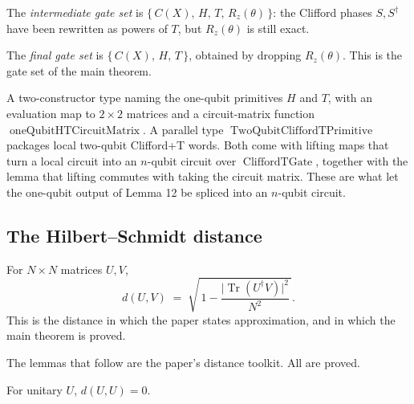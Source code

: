 \begin{definition}
  \label{def:gate_cliffordtrz}
  \leanok
  The \emph{intermediate gate set} is
  $\{\, C(X),\, H,\, T,\, R_z(\theta) \,\}$: the Clifford phases $S, S^\dagger$
  have been rewritten as powers of $T$, but $R_z(\theta)$ is still exact.
\end{definition}

\begin{definition}
  \label{def:gate_cliffordt}
  \leanok
  The \emph{final gate set} is $\{\, C(X),\, H,\, T \,\}$, obtained by
  dropping $R_z(\theta)$.  This is the gate set of the main theorem.
\end{definition}

\begin{definition}
  \label{def:ht_primitive}
  \leanok
  A two-constructor type naming the one-qubit primitives $H$ and $T$, with an
  evaluation map to $2 \times 2$ matrices and a circuit-matrix function
  $\operatorname{oneQubitHTCircuitMatrix}$.  A parallel type
  $\operatorname{TwoQubitCliffordTPrimitive}$ packages local two-qubit
  Clifford+T words.  Both come with lifting maps that turn a local circuit into
  an $n$-qubit circuit over $\operatorname{CliffordTGate}$, together with the
  lemma that lifting commutes with taking the circuit matrix.  These are what
  let the one-qubit output of Lemma 12 be spliced into an $n$-qubit circuit.
\end{definition}

\subsection{The Hilbert--Schmidt distance}

\begin{definition}
  \label{def:hs_distance}
  \leanok
  For $N \times N$ matrices $U, V$,
  \[
    d(U,V) \;=\; \sqrt{\,1 - \frac{\lvert \operatorname{Tr}(U^\dagger V)
      \rvert^2}{N^2}\,}.
  \]
  This is the distance in which the paper states approximation, and in which
  the main theorem is proved.
\end{definition}

The lemmas that follow are the paper's distance toolkit.  All are proved.

\begin{lemma}
  \label{lem:hs_self}
  \leanok
  For unitary $U$, $d(U,U) = 0$.
\end{lemma}

